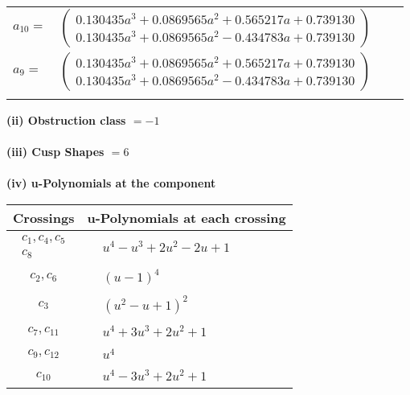 \documentclass[1p]{elsarticle_modified}
\theoremstyle{definition}
\begin{document}
\begin{tabular}{m{7pt} m{180pt} m{7pt} m{180pt} }
\flushright $a_{10}=$&$\begin{pmatrix}0.130435 a^{3}+0.0869565 a^{2}+0.565217 a+0.739130\\0.130435 a^{3}+0.0869565 a^{2}-0.434783 a+0.739130\end{pmatrix}$ \\
\flushright $a_{9}=$&$\begin{pmatrix}0.130435 a^{3}+0.0869565 a^{2}+0.565217 a+0.739130\\0.130435 a^{3}+0.0869565 a^{2}-0.434783 a+0.739130\end{pmatrix}$\\&\end{tabular}
\flushleft \textbf{(ii) Obstruction class $= -1$}\\~\\
\flushleft \textbf{(iii) Cusp Shapes $= 6$}\\~\\
\newpage\renewcommand{\arraystretch}{1}
\flushleft \textbf{(iv) u-Polynomials at the component}\newline \\
\begin{tabular}{m{50pt}|m{274pt}}
Crossings & \hspace{64pt}u-Polynomials at each crossing \\
\hline $$\begin{aligned}c_{1},c_{4},c_{5}\\c_{8}\end{aligned}$$&$\begin{aligned}
&u^4- u^3+2 u^2-2 u+1
\end{aligned}$\\
\hline $$\begin{aligned}c_{2},c_{6}\end{aligned}$$&$\begin{aligned}
&(u-1)^4
\end{aligned}$\\
\hline $$\begin{aligned}c_{3}\end{aligned}$$&$\begin{aligned}
&(u^2- u+1)^2
\end{aligned}$\\
\hline $$\begin{aligned}c_{7},c_{11}\end{aligned}$$&$\begin{aligned}
&u^4+3 u^3+2 u^2+1
\end{aligned}$\\
\hline $$\begin{aligned}c_{9},c_{12}\end{aligned}$$&$\begin{aligned}
&u^4
\end{aligned}$\\
\hline $$\begin{aligned}c_{10}\end{aligned}$$&$\begin{aligned}
&u^4-3 u^3+2 u^2+1
\end{aligned}$\\
\hline
\end{tabular}\\~\\
\end{document}
